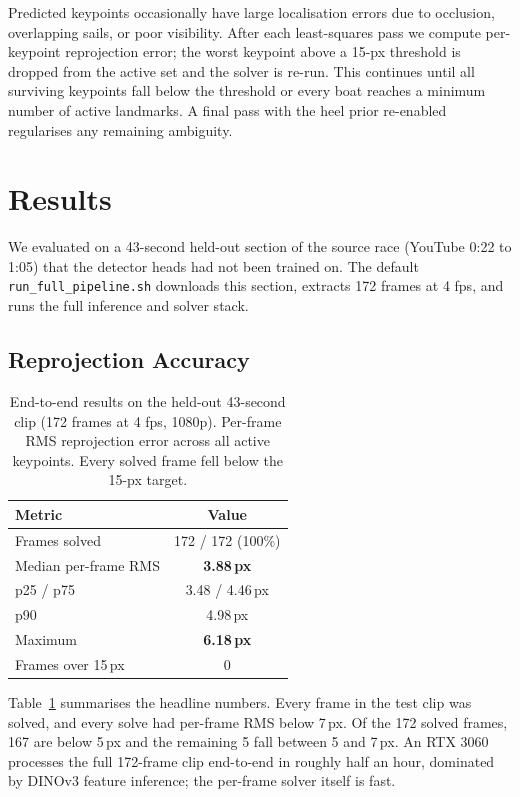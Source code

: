 \documentclass[10pt,twocolumn,letterpaper]{article}
\begin{document}
Predicted keypoints occasionally have large localisation errors due to occlusion, overlapping sails, or poor visibility.  After each least-squares pass we compute per-keypoint reprojection error; the worst keypoint above a 15-px threshold is dropped from the active set and the solver is re-run.  This continues until all surviving keypoints fall below the threshold or every boat reaches a minimum number of active landmarks.  A final pass with the heel prior re-enabled regularises any remaining ambiguity.

\section{Results}

We evaluated on a 43-second held-out section of the source race (YouTube 0:22 to 1:05) that the detector heads had not been trained on.  The default \texttt{run\_full\_pipeline.sh} downloads this section, extracts 172 frames at 4 fps, and runs the full inference and solver stack.

\subsection{Reprojection Accuracy}

\begin{table}[t]
\begin{center}
\begin{tabular}{l c}
\toprule
Metric & Value \\
\midrule
Frames solved          & 172 / 172 (100\%) \\
Median per-frame RMS   & \textbf{3.88\,px} \\
p25 / p75              & 3.48 / 4.46\,px \\
p90                    & 4.98\,px \\
Maximum                & \textbf{6.18\,px} \\
Frames over 15\,px     & 0 \\
\bottomrule
\end{tabular}
\end{center}
\caption{End-to-end results on the held-out 43-second clip (172 frames at 4 fps, 1080p).  Per-frame RMS reprojection error across all active keypoints.  Every solved frame fell below the 15-px target.}
\label{tab:results}
\end{table}

Table~\ref{tab:results} summarises the headline numbers.  Every frame in the test clip was solved, and every solve had per-frame RMS below 7\,px.  Of the 172 solved frames, 167 are below 5\,px and the remaining 5 fall between 5 and 7\,px.  An RTX 3060 processes the full 172-frame clip end-to-end in roughly half an hour, dominated by DINOv3 feature inference; the per-frame solver itself is fast.
\end{document}
